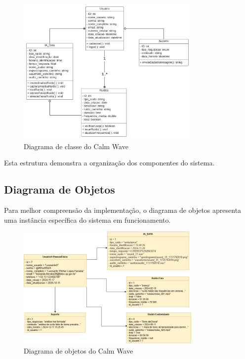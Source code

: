 \documentclass[
  a4paper,
  12pt,
  english,
  brazilian,
]{article}
\begin{document}
\begin{figure}[H]
\centering
\caption{Diagrama de classe do Calm Wave}%
\label{fig:diagrama-classe}
\includegraphics[width=0.8\textwidth]{Logos/Diagrama_classes.jpg}
\end{figure}

Esta estrutura demonstra a organização dos componentes do sistema.

\subsection*{Diagrama de Objetos}

Para melhor compreensão da implementação, o diagrama de objetos apresenta uma instância específica do sistema em funcionamento.

\begin{figure}[H]
\centering
\caption{Diagrama de objetos do Calm Wave}%
\label{fig:diagrama-objetos}
\includegraphics[width=0.8\textwidth]{Logos/Diagrama_objetos.jpg}
\end{figure}
\end{document}
